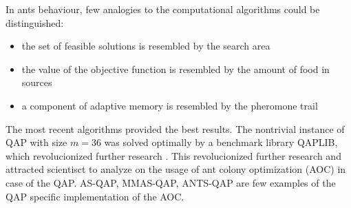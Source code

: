 In ants behaviour, few analogies to the computational algorithms could be distinguished:
\begin{itemize}
  \item the set of feasible solutions is resembled by the search area
  \item the value of the objective function is resembled by the amount of food in sources
  \item a component of adaptive memory is resembled by the pheromone trail
\end{itemize}

The most recent algorithms provided the best results.
The nontrivial instance of QAP with size $ m = 36 $ was solved optimally by a benchmark library QAPLIB, which revolucionized further research \cite{dorigo2004ant}.
This revolucionized further research and attracted scientisct to analyze on the usage of ant colony optimization (AOC) in case of the QAP.
AS-QAP, MMAS-QAP, ANTS-QAP are few examples of the QAP specific implementation of the AOC.

